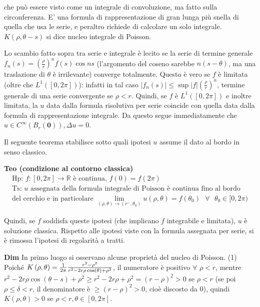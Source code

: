 \documentclass{article}
\begin{document}
che pu\`{o} essere visto come un integrale di convoluzione, ma fatto sulla
circonferenza. E' una formula di rappresentazione di gran lunga pi\`{u}
snella di quella che usa le serie, e peraltro richiede di calcolare un solo
integrale. $K\left( \rho ,\theta -s\right) $ si dice nucleo integrale di
Poisson.

Lo scambio fatto sopra tra serie e integrale \`{e} lecito se la serie di
termine generale $f_{n}\left( s\right) =\left( \frac{\rho }{r}\right)
^{n}f\left( s\right) \cos ns$ (l'argomento del coseno sarebbe $n\left(
s-\theta \right) $, ma una traslazione di $\theta $ \`{e} irrilevante)
converge totalmente. Questo \`{e} vero se $f$ \`{e} limitata (oltre che $%
L^{1}\left( \left[ 0,2\pi \right] \right) $): infatti in tal caso $%
\left\vert f_{n}\left( s\right) \right\vert \leq \sup \left\vert
f\right\vert \left( \frac{\rho }{r}\right) ^{n}$, termine generale di una
serie convergente se $\rho <r$. Quindi, se $f$ \`{e} $L^{1}\left( \left[
0,2\pi \right] \right) $ e inoltre limitata, la $u$ data dalla formula
risolutiva per serie coincide con quella data dalla formula di
rappresentazione integrale. Da questo segue immediatamente che $u\in
C^{\infty }\left( B_{r}\left( \mathbf{0}\right) \right) ,\Delta u=0$.

Il seguente teorema stabilisce sotto quali ipotesi $u$ assume il dato al
bordo in senso classico.

\textbf{Teo (condizione al contorno classica)}
\begin{gather*}
\text{Hp}\text{: }f:\left[ 0,2\pi \right] \rightarrow 
\mathbb{R}
\text{ \`{e} continua, }f\left( 0\right) =f\left( 2\pi \right) \\
\text{Ts}\text{: }u\text{ assegnata della formula integrale di Poisson \`{e}
continua fino al bordo } \\
\text{del cerchio e in particolare }\lim_{\left( \rho ,\theta \right)
\rightarrow \left( r^{-},\theta _{0}\right) }u\left( \rho ,\theta \right)
=f\left( \theta _{0}\right) \text{ }\forall \text{ }\theta _{0}\in \lbrack
0,2\pi )
\end{gather*}

Quindi, se $f$ soddisfa queste ipotesi (che implicano $f$ integrabile e
limitata), $u$ \`{e} soluzione classica. Rispetto alle ipotesi viste con la
formula assegnata per serie, si \`{e} rimossa l'ipotesi di regolarit\`{a} a
tratti.

\textbf{Dim} In primo luogo si osservano alcune propriet\`{a} del nucleo di
Poisson. (1) Poich\'{e} $K\left( \rho ,\theta \right) =\frac{1}{2\pi }\frac{%
r^{2}-\rho ^{2}}{r^{2}-2r\rho \cos \left( \theta \right) +\rho ^{2}}$, il
numeratore \`{e} positivo $\forall $ $\rho <r$, mentre $r^{2}-2r\rho \cos
\left( \theta -s\right) +\rho ^{2}\geq r^{2}-2r\rho +\rho ^{2}=\left( r-\rho
\right) ^{2}>0$ se $\rho <r$ (se poi $\rho \leq \delta <r$, il denominatore 
\`{e} $\geq \left( r-\rho \right) ^{2}>0$, cio\`{e} discosto da $0$), quindi 
$K\left( \rho ,\theta \right) >0$ se $\rho <r,\theta \in \left[ 0,2\pi %
\right] $.
\end{document}

